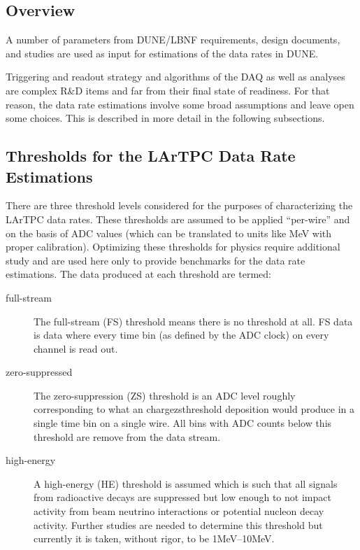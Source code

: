 \subsection{Overview}

A number of parameters from DUNE/LBNF requirements, design documents,  and studies are used  as input
for estimations of the data rates in DUNE.


Triggering and readout strategy and algorithms of the DAQ as well as analyses are complex R\&D items and far from their final state of readiness.
For that reason, the data rate estimations involve some broad assumptions and leave open some choices.
This is described in more detail in the following subsections.


\subsection{Thresholds for the LArTPC Data Rate Estimations}

There are three threshold levels considered for the purposes of characterizing the LArTPC data rates.
These thresholds are assumed to be applied ``per-wire'' and on the basis of ADC values (which can be translated
to units like MeV with proper calibration).
Optimizing these thresholds for physics require additional study and
are used here only to provide benchmarks for the data rate estimations.
The data produced at each threshold are termed:

\begin{description}
\item[full-stream] The full-stream (FS) threshold means there is no threshold at all.
FS data is data where every time bin (as defined by the ADC clock) on every channel is read out.
\item[zero-suppressed] The zero-suppression (ZS) threshold is an ADC
  level roughly corresponding to what an chargezsthreshold deposition
  would produce in a single time bin on a single wire.
  All bins with ADC counts below this threshold are remove from the
  data stream.
\item[high-energy] A high-energy (HE) threshold is assumed which is
  such that all signals from radioactive decays are suppressed but low
  enough to not impact activity from beam neutrino interactions or
  potential nucleon decay activity.
  Further studies are needed to determine this threshold but currently
  it is taken, without rigor, to be 1MeV--10MeV.
\end{description}

